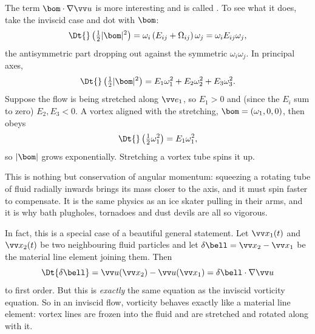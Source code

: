 The term $\bom \cdot \nabla \vv u$ is more interesting and is called . To see what it does, take the inviscid case and dot with $\bom$:
$$
\Dt{}\left(\tfrac{1}{2}|\bom|^2\right) = \omega_i \left(E_{ij} + \Omega_{ij}\right)\omega_j = \omega_i E_{ij}\omega_j,
$$
the antisymmetric part dropping out against the symmetric $\omega_i \omega_j$. In principal axes,
$$
\Dt{}\left(\tfrac{1}{2}|\bom|^2\right) = E_1 \omega_1^2 + E_2\omega_2^2 + E_3\omega_3^2.
$$
Suppose the flow is being stretched along $\vv e_1$, so $E_1 > 0$ and (since the $E_i$ sum to zero) $E_2, E_3 < 0$. A vortex aligned with the stretching, $\bom = (\omega_1, 0, 0)$, then obeys
$$
\Dt{}\left(\tfrac{1}{2}\omega_1^2\right) = E_1 \omega_1^2,
$$
so $|\bom|$ grows exponentially. Stretching a vortex tube spins it up.

\begin{center}
\end{center}

This is nothing but conservation of angular momentum: squeezing a rotating tube of fluid radially inwards brings its mass closer to the axis, and it must spin faster to compensate. It is the same physics as an ice skater pulling in their arms, and it is why bath plugholes, tornadoes and dust devils are all so vigorous.

In fact, this is a special case of a beautiful general statement. Let $\vv x_1(t)$ and $\vv x_2(t)$ be two neighbouring fluid particles and let $\delta\bell = \vv x_2 - \vv x_1$ be the material line element joining them. Then
$$
\Dt{\delta \bell} = \vv u(\vv x_2) - \vv u(\vv x_1) = \delta\bell \cdot \nabla \vv u
$$
to first order. But this is \emph{exactly} the same equation as the inviscid vorticity equation. So in an inviscid flow, vorticity behaves exactly like a material line element: vortex lines are frozen into the fluid and are stretched and rotated along with it.

